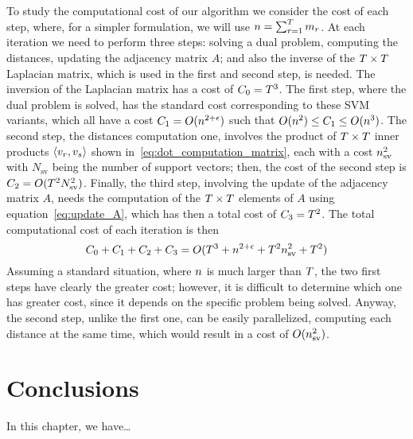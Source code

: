 To study the computational cost of our algorithm we consider the cost of each step, where, for a simpler formulation, we will use $n = \sum_{r=1}^T m_r$.
At each iteration we need to perform three steps: solving a dual problem, computing the distances, updating the adjacency matrix $A$; and also the inverse of the $T \times T$ Laplacian matrix, which is used in the first and second step, is needed. The inversion of the Laplacian matrix has a cost of $C_0 = T^3$.
The first step, where the dual problem is solved, has the standard cost corresponding to these SVM variants, which all have a cost $C_1 = O(n^{2+\epsilon})$ such that $O(n^2) \leq C_1 \leq O(n^3)$.
The second step, the distances computation one, involves the product of $T \times T$ inner products $\left\langle v_r, v_s \right\rangle$ shown in~\eqref{eq:dot_computation_matrix}, each with a cost $n_{\text{sv}}^2$ with $N_{\text{sv}}$ being the number of support vectors; then, the cost of the second step is $C_2 = O(T^2 N_\text{sv}^2)$. Finally, the third step, involving the update of the adjacency matrix $A$, needs the computation of the $T \times T$ elements of $A$ using equation~\eqref{eq:update_A}, which has then a total cost of $C_3 = T^2$.
The total computational cost of each iteration is then
$$ C_0 + C_1 + C_2 + C_3 = O(T^3 + n^{2+\epsilon} + T^2 n_\text{sv}^2 + T^2)$$
Assuming a standard situation, where $n$ is much larger than $T$, the two first steps have clearly the greater cost; however, it is difficult to determine which one has greater cost, since it depends on the specific problem being solved. Anyway, the second step, unlike the first one, can be easily parallelized, computing each distance at the same time, which would result in a cost of $O(n_\text{sv}^2)$. 




\section{Conclusions}\label{sec-conclusions-4}

In this chapter, we have\dots
